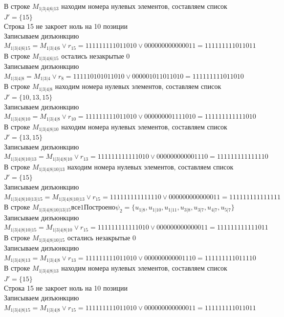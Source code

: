 \documentclass[12pt,a4paper]{report}
\begin{document}
В строке $M_{1 | 3 | 4 | 6 | 13}$ находим номера нулевых элементов, составляем список $J' = \{15\}$ \\
Строка 15 не закроет ноль на 10 позиции \\
Записываем дизъюнкцию $M_{1 | 3 | 4 | 6 | 15} = M_{1 | 3 | 4 | 6}\vee r_{15} = 111111111011010 \vee 000000000000011 = 111111111011011$ \\
В строке $M_{1 | 3 | 4 | 6 | 15}$ остались незакрытые $0$ \\
Записываем дизъюнкцию $M_{1 | 3 | 4 | 8} = M_{1 | 3 | 4}\vee r_{8} = 111110101011010 \vee 000001011011010 = 111111111011010$ \\
В строке $M_{1 | 3 | 4 | 8}$ находим номера нулевых элементов, составляем список $J' = \{10, 13, 15\}$ \\
Записываем дизъюнкцию $M_{1 | 3 | 4 | 8 | 10} = M_{1 | 3 | 4 | 8}\vee r_{10} = 111111111011010 \vee 000000001111010 = 111111111111010$ \\
В строке $M_{1 | 3 | 4 | 8 | 10}$ находим номера нулевых элементов, составляем список $J' = \{13, 15\}$ \\
Записываем дизъюнкцию $M_{1 | 3 | 4 | 8 | 10 | 13} = M_{1 | 3 | 4 | 8 | 10}\vee r_{13} = 111111111111010 \vee 000000000001110 = 111111111111110$ \\
В строке $M_{1 | 3 | 4 | 8 | 10 | 13}$ находим номера нулевых элементов, составляем список $J' = \{15\}$ \\
Записываем дизъюнкцию $M_{1 | 3 | 4 | 8 | 10 | 13 | 15} = M_{1 | 3 | 4 | 8 | 10 | 13}\vee r_{15} = 111111111111110 \vee 000000000000011 = 111111111111111$ \\
В строке $M_{1 | 3 | 4 | 8 | 10 | 13 | 15} все 1 Построено \psi_{2} = \{u_{1 | 8},u_{1 | 10},u_{1 | 11},u_{3 | 8},u_{3 | 7},u_{4 | 7},u_{5 | 7}\}$ \\
Записываем дизъюнкцию $M_{1 | 3 | 4 | 8 | 10 | 15} = M_{1 | 3 | 4 | 8 | 10}\vee r_{15} = 111111111111010 \vee 000000000000011 = 111111111111011$ \\
В строке $M_{1 | 3 | 4 | 8 | 10 | 15}$ остались незакрытые $0$ \\
Записываем дизъюнкцию $M_{1 | 3 | 4 | 8 | 13} = M_{1 | 3 | 4 | 8}\vee r_{13} = 111111111011010 \vee 000000000001110 = 111111111011110$ \\
В строке $M_{1 | 3 | 4 | 8 | 13}$ находим номера нулевых элементов, составляем список $J' = \{15\}$ \\
Строка 15 не закроет ноль на 10 позиции \\
Записываем дизъюнкцию $M_{1 | 3 | 4 | 8 | 15} = M_{1 | 3 | 4 | 8}\vee r_{15} = 111111111011010 \vee 000000000000011 = 111111111011011$ \\
\end{document}
